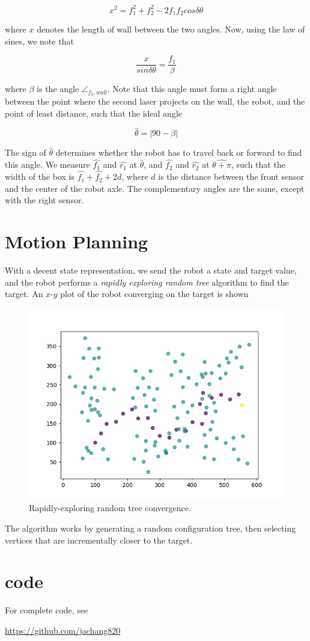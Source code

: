 \documentclass[11pt]{article}
\begin{document}
\begin{equation}
x^2 = f_1^2 + f_2^2 - 2 f_1 f_2 cos\delta\theta
\end{equation}

where $x$ denotes the length of wall between the two angles. Now, using the law of sines, we note that

\begin{equation}
\frac{x}{sin\delta\theta} = \frac{f_1}{\beta}
\end{equation}

where $\beta$ is the angle $\angle_{f_2, wall}$. Note that this angle must form a right angle between the point where the second laser projects on the wall, the robot, and the point of least distance, such that the ideal angle

\begin{equation}
\hat{\theta} = |90 - \beta|
\end{equation}

The sign of $\hat{\theta}$ determines whether the robot has to travel back or forward to find this angle. We measure $\hat{f_1}$ and $\hat{r_1}$ at $\hat{\theta}$, and $\hat{f_2}$ and $\hat{r_2}$ at $\hat{\theta + \pi}$, such that the width of the box is $\hat{f_1} + \hat{f_2} + 2d$, where $d$ is the distance between the front sensor and the center of the robot axle. The complementary angles are the same, except with the right sensor.

\section{Motion Planning}

With a decent state representation, we send the robot a state and target value, and the robot performs a \emph{rapidly exploring random tree} algorithm to find the target. An $x$-$y$ plot of the robot converging on the target is shown

\begin{figure}[H]
	\includegraphics[width=\linewidth]{fig2.png}
	\caption{Rapidly-exploring random tree convergence.}
	\label{fig:rrt}
\end{figure}

The algorithm works by generating a random configuration tree, then selecting vertices that are incrementally closer to the target.

\section{code}

For complete code, see

	\href{https://github.com/jachang820}{https://github.com/jachang820}
\end{document}
